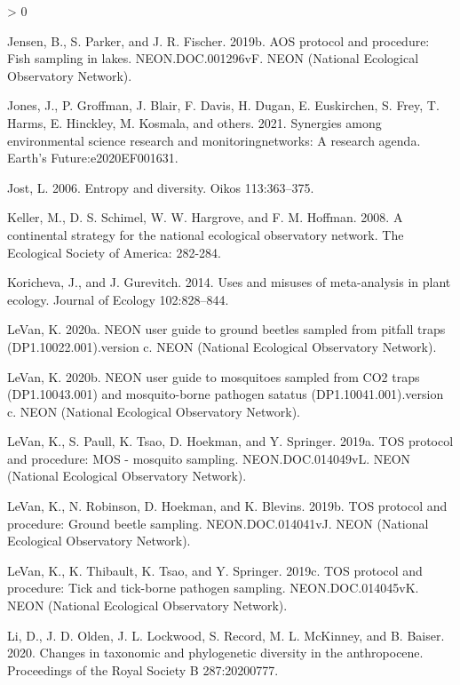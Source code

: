 \documentclass[
  12pt,
]{article}
\newlength{\cslhangindent}
\newenvironment{CSLReferences}[2] %
 {%
  \setlength{\parindent}{0pt}
  \ifodd #1 \everypar{\setlength{\hangindent}{\cslhangindent}}\ignorespaces\fi
  \ifnum #2 > 0
  \setlength{\parskip}{#2\baselineskip}
  \fi
 }%
 {}
\begin{document}
\begin{CSLReferences}{1}{0}
\leavevmode\hypertarget{ref-Jensen2019b}{}%
Jensen, B., S. Parker, and J. R. Fischer. 2019b. AOS protocol and procedure: Fish sampling in lakes. NEON.DOC.001296vF. NEON (National Ecological Observatory Network).

\leavevmode\hypertarget{ref-jones2021synergies}{}%
Jones, J., P. Groffman, J. Blair, F. Davis, H. Dugan, E. Euskirchen, S. Frey, T. Harms, E. Hinckley, M. Kosmala, and others. 2021. Synergies among environmental science research and monitoringnetworks: A research agenda. Earth's Future:e2020EF001631.

\leavevmode\hypertarget{ref-jost2006entropy}{}%
Jost, L. 2006. Entropy and diversity. Oikos 113:363--375.

\leavevmode\hypertarget{ref-keller2008continental}{}%
Keller, M., D. S. Schimel, W. W. Hargrove, and F. M. Hoffman. 2008. A continental strategy for the national ecological observatory network. The Ecological Society of America: 282-284.

\leavevmode\hypertarget{ref-koricheva2014uses}{}%
Koricheva, J., and J. Gurevitch. 2014. Uses and misuses of meta-analysis in plant ecology. Journal of Ecology 102:828--844.

\leavevmode\hypertarget{ref-LeVan2020}{}%
LeVan, K. 2020a. NEON user guide to ground beetles sampled from pitfall traps (DP1.10022.001).version c. NEON (National Ecological Observatory Network).

\leavevmode\hypertarget{ref-LeVan2020b}{}%
LeVan, K. 2020b. NEON user guide to mosquitoes sampled from CO2 traps (DP1.10043.001) and mosquito-borne pathogen satatus (DP1.10041.001).version c. NEON (National Ecological Observatory Network).

\leavevmode\hypertarget{ref-LeVan2019b}{}%
LeVan, K., S. Paull, K. Tsao, D. Hoekman, and Y. Springer. 2019a. TOS protocol and procedure: MOS - mosquito sampling. NEON.DOC.014049vL. NEON (National Ecological Observatory Network).

\leavevmode\hypertarget{ref-LeVan2019}{}%
LeVan, K., N. Robinson, D. Hoekman, and K. Blevins. 2019b. TOS protocol and procedure: Ground beetle sampling. NEON.DOC.014041vJ. NEON (National Ecological Observatory Network).

\leavevmode\hypertarget{ref-LeVan2019c}{}%
LeVan, K., K. Thibault, K. Tsao, and Y. Springer. 2019c. TOS protocol and procedure: Tick and tick-borne pathogen sampling. NEON.DOC.014045vK. NEON (National Ecological Observatory Network).

\leavevmode\hypertarget{ref-li2020changes}{}%
Li, D., J. D. Olden, J. L. Lockwood, S. Record, M. L. McKinney, and B. Baiser. 2020. Changes in taxonomic and phylogenetic diversity in the anthropocene. Proceedings of the Royal Society B 287:20200777.


\end{CSLReferences}
\end{document}
